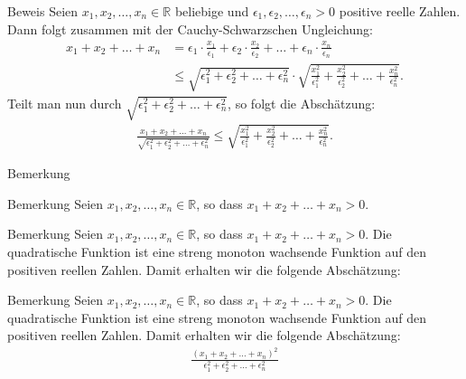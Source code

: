 \documentclass[10pt]{beamer}
\def\bR{\mathbb{R}}
\begin{document}
\begin{frame}{Beweis}
    Seien \( x_{1}, x_{2}, \ldots, x_{n} \in \bR \) beliebige und \( \epsilon_{1}, \epsilon_{2}, \ldots, \epsilon_{n} > 0 \) positive reelle Zahlen. Dann folgt zusammen mit der Cauchy-Schwarzschen Ungleichung:
    \begin{align*}
        x_{1} + x_{2} + \ldots + x_{n}
        & = \epsilon_{1} \cdot \frac{x_{1}}{\epsilon_{1}} + \epsilon_{2} \cdot \frac{x_{2}}{\epsilon_{2}} + \ldots + \epsilon_{n} \cdot \frac{x_{n}}{\epsilon_{n}} \\
        & \leq \sqrt{\epsilon_{1}^{2} + \epsilon_{2}^{2} + \ldots + \epsilon_{n}^{2}} \cdot \sqrt{\frac{x_{1}^{2}}{\epsilon_{1}^{2}} + \frac{x_{2}^{2}}{\epsilon_{2}^{2}} + \ldots + \frac{x_{n}^{2}}{\epsilon_{n}^{2}}}.
    \end{align*}
    Teilt man nun durch \( \sqrt{\epsilon_{1}^{2} + \epsilon_{2}^{2} + \ldots + \epsilon_{n}^{2}} \), so folgt die Abschätzung:
    \begin{align*}
        \frac{x_{1} + x_{2} + \ldots + x_{n}}{\sqrt{\epsilon_{1}^{2} + \epsilon_{2}^{2} + \ldots + \epsilon_{n}^{2}}}
        \leq \sqrt{\frac{x_{1}^{2}}{\epsilon_{1}^{2}} + \frac{x_{2}^{2}}{\epsilon_{2}^{2}} + \ldots + \frac{x_{n}^{2}}{\epsilon_{n}^{2}}}.
    \end{align*}
\end{frame}



\begin{frame}{Bemerkung}
    
\end{frame}



\begin{frame}{Bemerkung}
    Seien \( x_{1}, x_{2}, \ldots, x_{n} \in \bR \), so dass \( x_{1} + x_{2} + \ldots + x_{n} > 0 \).
\end{frame}



\begin{frame}{Bemerkung}
    Seien \( x_{1}, x_{2}, \ldots, x_{n} \in \bR \), so dass \( x_{1} + x_{2} + \ldots + x_{n} > 0 \). Die quadratische Funktion ist eine streng monoton wachsende Funktion auf den positiven reellen Zahlen. Damit erhalten wir die folgende Abschätzung:
\end{frame}



\begin{frame}{Bemerkung}
    Seien \( x_{1}, x_{2}, \ldots, x_{n} \in \bR \), so dass \( x_{1} + x_{2} + \ldots + x_{n} > 0 \). Die quadratische Funktion ist eine streng monoton wachsende Funktion auf den positiven reellen Zahlen. Damit erhalten wir die folgende Abschätzung:
    \begin{align*}
        \frac{\left( x_{1} + x_{2} + \ldots + x_{n} \right)^{2}}{\epsilon_{1}^{2} + \epsilon_{2}^{2} + \ldots + \epsilon_{n}^{2}}
    \end{align*}
\end{frame}
\end{document}
